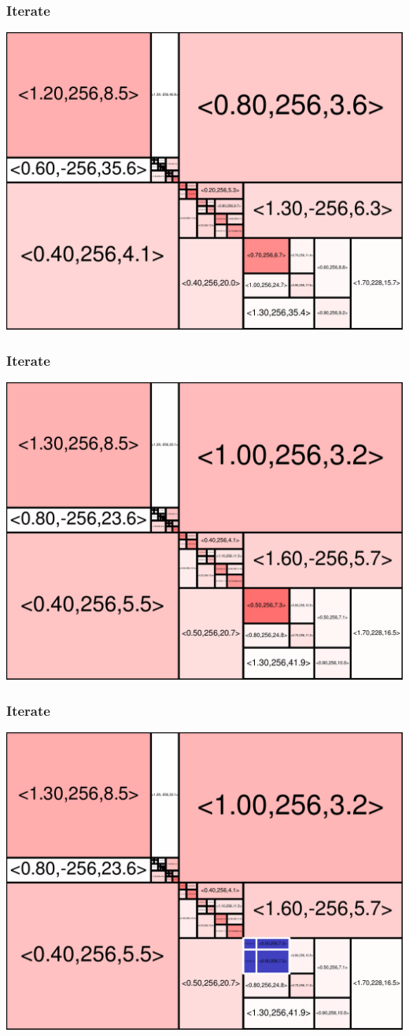 \begin{frame}
\frametitle{Iterate}\begin{centering}\includegraphics[width=8.5 cm]{remy-graph/graph/test57.pdf}

\end{centering}\end{frame}


\begin{frame}
\frametitle{Iterate}\begin{centering}\includegraphics[width=8.5 cm]{remy-graph/graph/test58.pdf}

\end{centering}\end{frame}


\begin{frame}
\frametitle{Iterate}\begin{centering}\includegraphics[width=8.5 cm]{remy-graph/graph/test59.pdf}

\end{centering}\end{frame}


